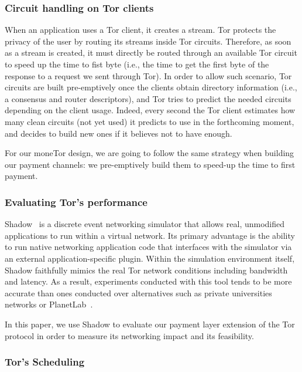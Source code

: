 \subsubsection{Circuit handling on Tor clients}
%

When an application uses a Tor client, it creates a stream. Tor protects the privacy of the user by routing its streams inside Tor circuits. Therefore, as soon as a stream is created, it must directly be routed through an available Tor circuit to speed up the time to fist byte (i.e., the time to get the first byte of the response to a request we sent through Tor). In order to allow such scenario, Tor circuits are built pre-emptively once the clients obtain directory information (i.e., a consensus and router descriptors), and Tor tries to predict the needed circuits depending on the client usage. Indeed, every second the Tor client estimates how many clean circuits (not yet used) it predicts to use in the forthcoming moment, and decides to build new ones if it believes not to have enough.

For our moneTor design, we are going to follow the same strategy when building our payment channels: we pre-emptively build them to speed-up the time to first payment.

\subsubsection{Evaluating Tor's performance}
Shadow~\cite{jansen2011shadow} is a discrete event networking simulator that allows
real, unmodified applications to run within a virtual network. Its primary
advantage is the ability to run native networking application code that
interfaces with the simulator via an external application-specific
plugin. Within the simulation environment itself, Shadow faithfully mimics the
real Tor network conditions including bandwidth and latency. As a result,
experiments conducted with this tool tends to be more accurate than ones
conducted over alternatives such as private universities networks or
PlanetLab~\cite{Chun:2003:POT:956993.956995}.

In this paper, we use Shadow to evaluate our payment layer extension of the Tor
protocol in order to measure its networking impact and its feasibility.

\subsubsection{Tor's Scheduling}

